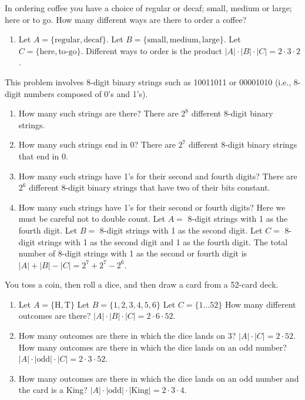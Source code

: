 \documentclass[openany, 12pt]{book}
\begin{document}
\begin{exercise}{}{}
	In ordering coffee you have a choice of regular or decaf; small, medium or
	large; here or to go. How many different ways are there to order a coffee?
	\begin{enumerate}[label = {(\arabic*)}]
		\item Let $A = \{\text{regular}, \text{decaf}\}$.
		      Let $B = \{\text{small}, \text{medium}, \text{large}\}$.
		      Let $C = \{\text{here}, \text{to-go}\}$.
		      Different ways to order is the product $|A|\cdot|B|\cdot|C| = 2 \cdot 3 \cdot 2$.
	\end{enumerate}
\end{exercise}

\begin{exercise}{}{}
	This problem involves 8-digit binary strings such as 10011011 or 00001010
	(i.e., 8-digit numbers composed of 0's and 1's).
	\begin{enumerate}[label = {(\alph*)}]
		\item How many such strings are there?
		      There are $2^8$ different 8-digit binary strings.
		\item How many such strings end in 0?
		      There are $2^7$ different 8-digit binary strings that end in $0$.
		\item How many such strings have 1's for their second and fourth digits?
		      There are $2^6$ different 8-digit binary strings that have two of
		      their bits constant.
		\item How many such strings have 1's for their second or fourth digits?
		      Here we must be careful not to double count.
		      Let $A =$ 8-digit strings with 1 as the fourth digit.
		      Let $B =$ 8-digit strings with 1 as the second digit.
		      Let $C =$ 8-digit strings with 1 as the second digit and 1 as the
		      fourth digit.
		      The total number of 8-digit strings with 1 as the second or fourth
		      digit is $|A| + |B| - |C| = 2^7+2^7-2^6$.
	\end{enumerate}
\end{exercise}

\begin{exercise}{}{}
	You toss a coin, then roll a dice, and then draw a card
	from a 52-card deck.
	\begin{enumerate}[label = {(\arabic*)}]
		\item Let $A = \{\text{H}, \text{T}\}$
		      Let $B = \{1, 2, 3, 4, 5, 6\}$
		      Let $C = \{1\ldots 52 \}$
		      How many different outcomes are there?
		      $|A| \cdot |B| \cdot |C| = 2 \cdot 6 \cdot 52$.
		\item How many outcomes are there in which the dice lands on $3$?
		      $|A| \cdot |C| = 2 \cdot 52$.
		      How many outcomes are there in which the dice lands on an odd number?
		      $|A| \cdot |\text{odd}| \cdot |C| = 2 \cdot 3 \cdot 52$.
		\item How many outcomes are there in which the dice lands on an odd number
		      and the card is a King?
		      $|A| \cdot |\text{odd}| \cdot |\text{King}| = 2 \cdot 3 \cdot 4$.
	\end{enumerate}
\end{exercise}
\end{document}
